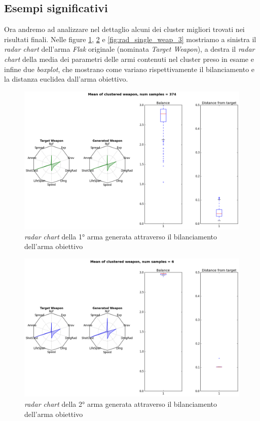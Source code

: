\documentclass[12pt, italian]{toptesi}
\begin{document}
\subsection{Esempi significativi}
Ora andremo ad analizzare nel dettaglio alcuni dei cluster migliori trovati nei risultati finali.
Nelle figure \ref{fig:rad_single_weap_1}, \ref{fig:rad_single_weap_2} e \ref{fig:rad_single_weap_3} mostriamo a sinistra il \emph{radar chart} dell'arma \emph{Flak} originale (nominata \emph{Target Weapon}), a destra il \emph{radar chart} della media dei parametri delle armi contenuti nel cluster preso in esame e infine due \emph{boxplot}, che mostrano come variano rispettivamente il bilanciamento e la distanza euclidea dall'arma obiettivo.
\begin{figure}[htp]
\centering
\includegraphics[width=1.0\textwidth]{rad_single_weap_1}
\caption{\emph{radar chart} della 1°  arma generata  attraverso il bilanciamento dell'arma obiettivo}
\label{fig:rad_single_weap_1}
\end{figure}
\begin{figure}[htp]
\centering
\includegraphics[width=1.0\textwidth]{rad_single_weap_2}
\caption{\emph{radar chart} della 2° arma generata  attraverso il bilanciamento dell'arma obiettivo}
\label{fig:rad_single_weap_2}
\end{figure}
\end{document}
